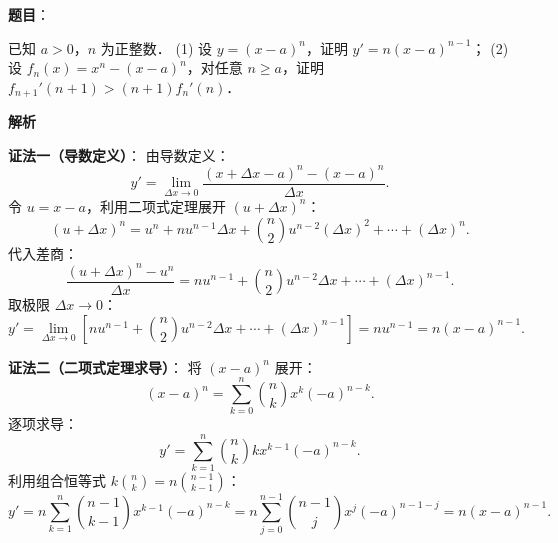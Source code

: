 \begin{answer}

\textbf{题目}：

已知 $a > 0$，$n$ 为正整数．
(1) 设 $y = (x - a)^n$，证明 $y' = n(x - a)^{n-1}$；
(2) 设 $f_n(x) = x^n - (x - a)^n$，对任意 $n \ge a$，证明 $f_{n+1}'(n+1) > (n+1)f_n'(n)$．

\textbf{解析}


\textbf{证法一（导数定义）}：
由导数定义：
\nopagebreak[4]
\[y' = \lim_{\Delta x \to 0} \frac{(x + \Delta x - a)^n - (x - a)^n}{\Delta x}.\]
令 $u = x - a$，利用二项式定理展开 $(u + \Delta x)^n$：
\nopagebreak[4]
\[(u + \Delta x)^n = u^n + n u^{n-1} \Delta x + \binom{n}{2} u^{n-2} (\Delta x)^2 + \cdots + (\Delta x)^n.\]
代入差商：
\nopagebreak[4]
\[\frac{(u + \Delta x)^n - u^n}{\Delta x} = n u^{n-1} + \binom{n}{2} u^{n-2} \Delta x + \cdots + (\Delta x)^{n-1}.\]
取极限 $\Delta x \to 0$：
\nopagebreak[4]
\[y' = \lim_{\Delta x \to 0} \left[ n u^{n-1} + \binom{n}{2} u^{n-2} \Delta x + \cdots + (\Delta x)^{n-1} \right] = n u^{n-1} = n(x - a)^{n-1}.\]

\textbf{证法二（二项式定理求导）}：
将 $(x - a)^n$ 展开：
\nopagebreak[4]
\[(x - a)^n = \sum_{k=0}^n \binom{n}{k} x^k (-a)^{n-k}.\]
逐项求导：
\nopagebreak[4]
\[y' = \sum_{k=1}^n \binom{n}{k} k x^{k-1} (-a)^{n-k}.\]
利用组合恒等式 $k \binom{n}{k} = n \binom{n-1}{k-1}$：
\nopagebreak[4]
\[y' = n \sum_{k=1}^n \binom{n-1}{k-1} x^{k-1} (-a)^{n-k} = n \sum_{j=0}^{n-1} \binom{n-1}{j} x^j (-a)^{n-1-j} = n(x - a)^{n-1}.\]



\end{answer}
